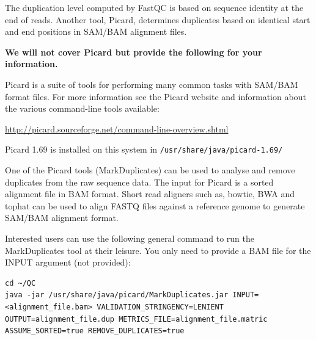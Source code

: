 \begin{advanced}
\begin{information}
The duplication level computed by FastQC is based on sequence identity at the
end of reads. Another tool, Picard, determines duplicates based on identical
start and end positions in SAM/BAM alignment files.

\textbf{We will not cover Picard but
provide the following for your information.}

Picard is a suite of tools for performing many common tasks with SAM/BAM format
files. For more information see the Picard website and information about the
various command-line tools available:

\url{http://picard.sourceforge.net/command-line-overview.shtml}
\end{information}

\begin{information}
Picard 1.69 is installed on this system in \texttt{/usr/share/java/picard-1.69/}

One of the Picard tools (MarkDuplicates) can be used to analyse and remove
duplicates from the raw sequence data. The input for Picard is a sorted
alignment file in BAM format. Short read aligners such as, bowtie, BWA and tophat
can be used to align FASTQ files against a reference genome to generate
SAM/BAM alignment format.
\end{information}

\begin{steps}
Interested users can use the following general command to run the
MarkDuplicates tool at their leisure. You only need to provide a BAM file for the
INPUT argument (not provided):


\begin{lstlisting}[style=command_syntax]
cd ~/QC
java -jar /usr/share/java/picard/MarkDuplicates.jar INPUT=<alignment_file.bam> VALIDATION_STRINGENCY=LENIENT OUTPUT=alignment_file.dup METRICS_FILE=alignment_file.matric ASSUME_SORTED=true REMOVE_DUPLICATES=true

\end{lstlisting}
\end{steps}

\end{advanced}
